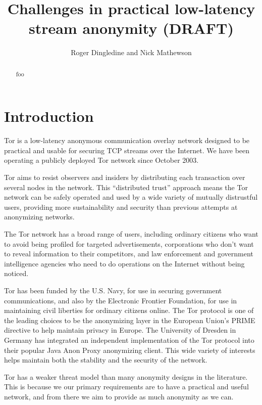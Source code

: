 \documentclass{llncs}
\begin{document}
\title{Challenges in practical low-latency stream anonymity (DRAFT)}

\author{Roger Dingledine and Nick Mathewson}

\maketitle
\pagestyle{empty}

\begin{abstract}
foo
\end{abstract}

\section{Introduction}

Tor is a low-latency anonymous communication overlay network
\cite{tor-design} designed to be practical and usable for securing TCP
streams over the Internet. We have been operating a publicly deployed
Tor network since October 2003.

Tor aims to resist observers and insiders by distributing each transaction
over several nodes in the network.  This ``distributed trust'' approach
means the Tor network can be safely operated and used by a wide variety
of mutually distrustful users, providing more sustainability and security
than previous attempts at anonymizing networks.

The Tor network has a broad range of users, including ordinary citizens
who want to avoid being profiled for targeted advertisements, corporations
who don't want to reveal information to their competitors, and law
enforcement and government intelligence agencies who need
to do operations on the Internet without being noticed.

Tor has been funded by the U.S. Navy, for use in securing government
communications, and also by the Electronic Frontier Foundation, for use
in maintaining civil liberties for ordinary citizens online. The Tor
protocol is one of the leading choices
to be the anonymizing layer in the European Union's PRIME directive to
help maintain privacy in Europe. The University of Dresden in Germany
has integrated an independent implementation of the Tor protocol into
their popular Java Anon Proxy anonymizing client. This wide variety of
interests helps maintain both the stability and the security of the
network.

Tor has a weaker threat model than many anonymity designs in the
literature. This is because we our primary requirements are to have a
practical and useful network, and from there we aim to provide as much
anonymity as we can.
\end{document}
